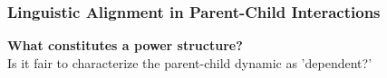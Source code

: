 \documentclass{beamer}
\begin{document}
\begin{frame}
\frametitle{Linguistic Alignment in Parent-Child Interactions}
\textbf{What constitutes a power structure?} \\
Is it fair to characterize the parent-child dynamic as 'dependent?'\\
\end{frame}








\end{document}
